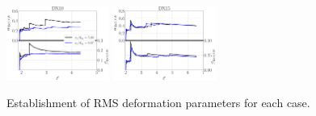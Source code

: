 \vspace*{0.2in}

\begin{figure}[ht]
	\centering
   \includegraphics[width=0.3\textwidth]{./part3_applications/figures_ch8_resolved/SPRAY_characterization/deformation/establishment_DX10_rms}
   \includegraphics[width=0.3\textwidth]{./part3_applications/figures_ch8_resolved/SPRAY_characterization/deformation/establishment_DX15_rms}
   \caption{Establishment of RMS deformation parameters for each case.}
\label{fig:app_BIMER_spray_deformation_establishment_rms}
\end{figure}
